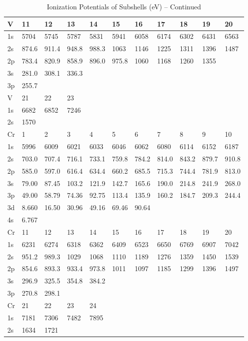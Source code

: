 \begin{table}
\begin{center}
\addtocounter{table}{-1}
\caption{Ionization Potentials of Subshells (eV) -- Continued}
\begin{tabular}{lllllllllll}
\hline
V&   11&  12& 13&  14&  15&  16&  17&  18&  19&  20\\
\hline
1s&  5704&  5745&  5787&  5831&  5941&
6058&  6174&  6302&  6431&  6563\\
2s& 874.6& 911.4& 948.8& 988.3& 1063& 1146& 1225&
1311&  1396&  1487\\
2p& 783.4& 820.9& 858.9& 896.0& 975.8&  1060&  1168&  1260&  1355\\
3s&
281.0& 308.1& 336.3\\
3p& 255.7\\
\hline
V&   21&  22&  23\\
\hline
1s&  6682&  6852&  7246\\
2s&  1570\\
\hline
Cr& 1&   2&   3&   4&   5&   6&   7&   8&   9&  10\\
\hline
1s&  5996&  6009&  6021&  6033&  6046&  6062&
6080&  6114&  6152&  6187\\
2s& 703.0& 707.4& 716.1& 733.1& 759.8& 784.2& 814.0& 843.2&
879.7& 910.8\\
2p& 585.0& 597.0& 616.4& 634.4& 660.2& 685.5& 715.3& 744.4& 781.9& 813.0\\
3s&
79.00& 87.45& 103.2& 121.9& 142.7& 165.6& 190.0& 214.8& 241.9& 268.0\\
3p& 49.00& 58.79&
74.36& 92.75& 113.4& 135.9& 160.2& 184.7& 209.3& 244.4\\
3d& 8.660& 16.50& 30.96& 49.16&
69.46& 90.64\\
4s& 6.767\\
\hline
Cr&  11&  12&  13&  14&  15&  16&  17&  18&  19&  20\\
\hline
1s&  6231&  6274&
6318&  6362&  6409&  6523&  6650&  6769&  6907&  7042\\
2s& 951.2& 989.3&  1029&  1068&
1110&  1189&  1276&  1359&  1450&  1539\\
2p& 854.6& 893.3& 933.4& 973.8& 1011& 1097&
1185&  1299&  1396&  1497\\
3s& 296.9& 325.5& 354.8& 384.2\\
3p& 270.8& 298.1\\
\hline
Cr&  21&  22& 23&  24\\
\hline
1s&  7181&  7306&  7482&  7895\\
2s&  1634&  1721\\

\end{tabular}
\end{center}
\end{table}
